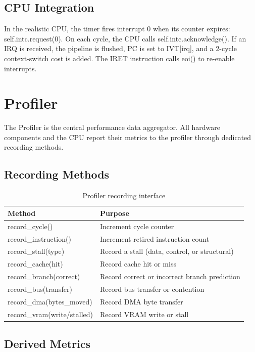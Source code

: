 \documentclass[12pt,a4paper,twoside]{book}
\theoremstyle{trinarytheorem}
\theoremstyle{trinarydefinition}
\newcommand{\code}[1]{\textsf{#1}}
\begin{document}
\subsection{CPU Integration}

In the realistic CPU, the timer fires interrupt 0 when its counter expires:
\code{self.intc.request(0)}. On each cycle, the CPU calls
\code{self.intc.acknowledge()}. If an IRQ is received, the pipeline is
flushed, PC is set to \code{IVT[irq]}, and a 2-cycle context-switch cost
is added. The \code{IRET} instruction calls \code{eoi()} to re-enable
interrupts.

\section{Profiler}

The \code{Profiler} is the central performance data aggregator. All
hardware components and the CPU report their metrics to the profiler through
dedicated recording methods.

\subsection{Recording Methods}

\begin{table}[H]
\centering
\caption{Profiler recording interface}
\label{tab:profilermethods}
\begin{tabular}{ll}
\toprule
Method & Purpose \\
\midrule
\code{record\_cycle()} & Increment cycle counter \\
\code{record\_instruction()} & Increment retired instruction count \\
\code{record\_stall(type)} & Record a stall (data, control, or structural) \\
\code{record\_cache(hit)} & Record cache hit or miss \\
\code{record\_branch(correct)} & Record correct or incorrect branch prediction \\
\code{record\_bus(transfer)} & Record bus transfer or contention \\
\code{record\_dma(bytes\_moved)} & Record DMA byte transfer \\
\code{record\_vram(write/stalled)} & Record VRAM write or stall \\
\bottomrule
\end{tabular}
\end{table}

\subsection{Derived Metrics}
\end{document}

